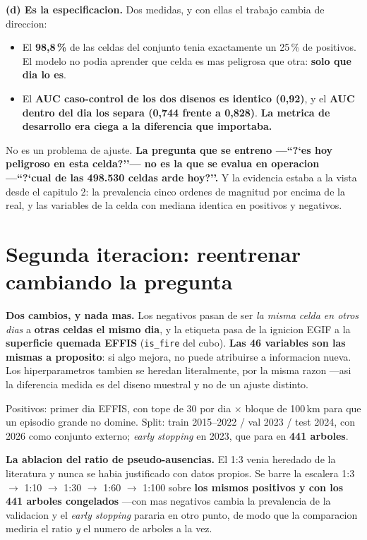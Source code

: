\documentclass[10pt,a4paper]{article}
\newcommand{\var}[1]{\texttt{\footnotesize #1}}
\begin{document}
\textbf{(d) Es la especificacion.} Dos medidas, y con ellas el trabajo cambia de direccion:
\begin{itemize}
\item El \textbf{98,8\,\%} de las celdas del conjunto tenia exactamente un 25\,\% de positivos. El
modelo no podia aprender que celda es mas peligrosa que otra: \textbf{solo que dia lo es}.
\item El \textbf{AUC caso-control de los dos disenos es identico (0,92)}, y el \textbf{AUC dentro
del dia los separa (0,744 frente a 0,828)}. \textbf{La metrica de desarrollo era ciega a la
diferencia que importaba.}
\end{itemize}

No es un problema de ajuste. \textbf{La pregunta que se entreno ---``?`es hoy peligroso en esta
celda?''--- no es la que se evalua en operacion ---``?`cual de las 498.530 celdas arde hoy?''.} Y la
evidencia estaba a la vista desde el capitulo 2: la prevalencia cinco ordenes de magnitud por
encima de la real, y las variables de la celda con mediana identica en positivos y negativos.

\section{Segunda iteracion: reentrenar cambiando la pregunta}

\textbf{Dos cambios, y nada mas.} Los negativos pasan de ser \emph{la misma celda en otros dias} a
\textbf{otras celdas el mismo dia}, y la etiqueta pasa de la ignicion EGIF a la \textbf{superficie
quemada EFFIS} (\var{is\_fire} del cubo). \textbf{Las 46 variables son las mismas a proposito}: si
algo mejora, no puede atribuirse a informacion nueva. Los hiperparametros tambien se heredan
literalmente, por la misma razon ---asi la diferencia medida es del diseno muestral y no de un
ajuste distinto.

Positivos: primer dia EFFIS, con tope de 30 por dia $\times$ bloque de 100\,km para que un episodio
grande no domine. Split: train 2015--2022 / val 2023 / test 2024, con 2026 como conjunto externo;
\emph{early stopping} en 2023, que para en \textbf{441 arboles}.

\textbf{La ablacion del ratio de pseudo-ausencias.} El 1:3 venia heredado de la literatura y nunca
se habia justificado con datos propios. Se barre la escalera 1:3 $\to$ 1:10 $\to$ 1:30 $\to$ 1:60
$\to$ 1:100 sobre \textbf{los mismos positivos y con los 441 arboles congelados} ---con mas
negativos cambia la prevalencia de la validacion y el \emph{early stopping} pararia en otro punto,
de modo que la comparacion mediria el ratio \emph{y} el numero de arboles a la vez.
\end{document}
